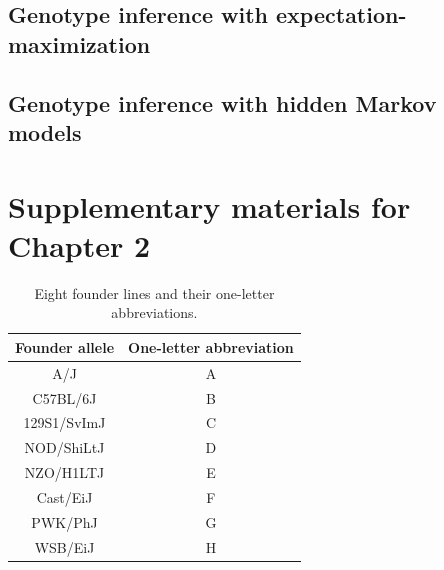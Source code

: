 \documentclass[oneside]{book}\usepackage[]{graphicx}\usepackage[]{color}
\begin{document}
\begin{appendices}



\section{Genotype inference with expectation-maximization}\label{sec:genotypes-em}








\section{Genotype inference with hidden Markov models}\label{sec:genotypes-hmm}







\chapter{Supplementary materials for Chapter 2}\label{sec:ch2-supp}



\begin{table}
  \caption{Eight founder lines and their one-letter abbreviations.}
  \label{table-letters}
\begin{center}
\small
  \begin{tabular}{ c | c }
    \hline
    Founder allele & One-letter abbreviation \\ \hline
    A/J & A \\
    C57BL/6J & B \\
    129S1/SvImJ & C \\
    NOD/ShiLtJ & D\\
    NZO/H1LTJ & E\\
    Cast/EiJ & F\\
    PWK/PhJ & G\\
    WSB/EiJ & H\\
    \hline
  \end{tabular}


\end{center}
\end{table}
\end{appendices}
\end{document}
